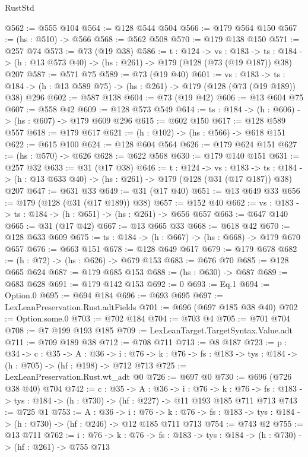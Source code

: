 \begin{lexlean}{RustStd}
\begin{coremodule}
@562 := @555 @104
@564 := @128 @544 @504
@566 := @179 @564 @150
@567 := (hs : @510) -> @566
@568 := @562 @508
@570 := @179 @138 @150
@571 := @257 @74
@573 := @73 (@19 @38)
@586 := {t : @124} ->
  {vs : @183} ->
  {ts : @184} -> (h : @13 @573 @40) -> (hs : @261) -> @179 (@128 (@73 (@19 @187)) @38) @207
@587 := @571 @75
@589 := @73 (@19 @40)
@601 := {vs : @183} ->
  {ts : @184} -> (h : @13 @589 @75) -> (hs : @261) -> @179 (@128 (@73 (@19 @189)) @38) @296
@602 := @587 @138
@604 := @73 (@19 @42)
@606 := @13 @604 @75
@607 := @558 @42
@609 := @128 @573 @549
@614 := {ts : @184} -> (h : @606) -> (hs : @607) -> @179 @609 @296
@615 := @602 @150
@617 := @128 @589 @557
@618 := @179 @617
@621 := (h : @102) -> (hs : @566) -> @618 @151
@622 := @615 @100
@624 := @128 @604 @564
@626 := @179 @624 @151
@627 := (hs : @570) -> @626
@628 := @622 @568
@630 := @179 @140 @151
@631 := @257 @32
@633 := @31 (@17 @38)
@646 := {t : @124} ->
  {vs : @183} ->
  {ts : @184} -> (h : @13 @633 @40) -> (hs : @261) -> @179 (@128 (@31 (@17 @187)) @38) @207
@647 := @631 @33
@649 := @31 (@17 @40)
@651 := @13 @649 @33
@656 := @179 (@128 (@31 (@17 @189)) @38)
@657 := @152 @40
@662 := {vs : @183} -> {ts : @184} -> (h : @651) -> (hs : @261) -> @656 @657
@663 := @647 @140
@665 := @31 (@17 @42)
@667 := @13 @665 @33
@668 := @618 @42
@670 := @128 @633 @609
@675 := {ts : @184} -> (h : @667) -> (hs : @668) -> @179 @670 @657
@676 := @663 @151
@678 := @128 @649 @617
@679 := @179 @678
@682 := (h : @72) -> (hs : @626) -> @679 @153
@683 := @676 @70
@685 := @128 @665 @624
@687 := @179 @685 @153
@688 := (hs : @630) -> @687
@689 := @683 @628
@691 := @179 @142 @153
@692 := 0
@693 := Eq.{1}
@694 := Option.{0}
@695 := @694 @184
@696 := @693 @695
@697 := LexLeanPreservation.Rust.adtFields
@701 := @696 (@697 @185 @38 @40)
@702 := Option.some.{0}
@703 := @702 @184
@704 := @703 @4
@705 := @701 @704
@708 := @7 @199 @193 @185
@709 := LexLeanTarget.TargetSyntax.Value.adt
@711 := @709 @189 @38
@712 := @708 @711
@713 := @8 @187
@723 := {p : @34} ->
  {c : @35} ->
  {A : @36} ->
  {i : @76} -> {k : @76} -> {fs : @183} -> {tys : @184} -> (h : @705) -> (hf : @198) -> @712 @713
@725 := LexLeanPreservation.Rust.wt_adt @0
@726 := @697 @0
@730 := @696 (@726 @38 @40) @704
@742 := {c : @35} ->
  {A : @36} ->
  {i : @76} ->
  {k : @76} -> {fs : @183} -> {tys : @184} -> (h : @730) -> (hf : @227) -> @11 @193 @185 @711 @713
@743 := @725 @1
@753 := {A : @36} ->
  {i : @76} ->
  {k : @76} -> {fs : @183} -> {tys : @184} -> (h : @730) -> (hf : @246) -> @12 @185 @711 @713
@754 := @743 @2
@755 := @13 @711
@762 := {i : @76} ->
  {k : @76} -> {fs : @183} -> {tys : @184} -> (h : @730) -> (hf : @261) -> @755 @713

\end{coremodule}
\end{lexlean}
